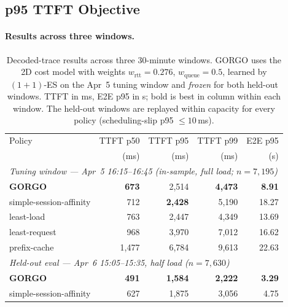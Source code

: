 \documentclass{article}
\begin{document}
\label{sec:results}

\subsection{p95 TTFT Objective}
\label{sec:results:p95}

\paragraph{Results across three windows.}

\begin{table}[t]
\centering
\small
\caption{Decoded-trace results across three 30-minute windows. GORGO uses the
  2D cost model with weights $w_{\mathrm{rtt}}{=}0.276$, $w_{\mathrm{queue}}{=}0.5$,
  learned by $(1{+}1)$-ES on the Apr~5 tuning window and \emph{frozen} for both
  held-out windows. TTFT in ms, E2E p95 in s; bold is best in column within each
  window. The held-out windows are replayed within capacity for every policy
  (scheduling-slip p95 $\le 10$\,ms).}
\label{tab:results}
\begin{tabular}{lrrrr}
\toprule
Policy & TTFT p50 & TTFT p95 & TTFT p99 & E2E p95 \\
       & (ms)     & (ms)     & (ms)     & (s)     \\
\midrule
\multicolumn{5}{l}{\textit{Tuning window --- Apr~5 16:15--16:45 (in-sample, full load; $n{=}7{,}195$)}} \\
\midrule
\textbf{GORGO }     & \textbf{673}    & 2{,}514          & \textbf{4{,}473} & \textbf{8.91}  \\
simple-session-affinity & 712             & \textbf{2{,}428} & 5{,}190          & 18.27 \\
least-load              & 763             & 2{,}447          & 4{,}349          & 13.69 \\
least-request           & 968             & 3{,}970          & 7{,}012          & 16.62 \\
prefix-cache            & 1{,}477         & 6{,}784          & 9{,}613          & 22.63 \\
\midrule
\multicolumn{5}{l}{\textit{Held-out eval --- Apr~6 15:05--15:35, half load ($n{=}7{,}630$)}} \\
\midrule
\textbf{GORGO }     & \textbf{491}    & \textbf{1{,}584} & \textbf{2{,}222} & \textbf{3.29} \\
simple-session-affinity & 627             & 1{,}875          & 3{,}056          & 4.75 \\

\end{tabular}
\end{table}
\end{document}
